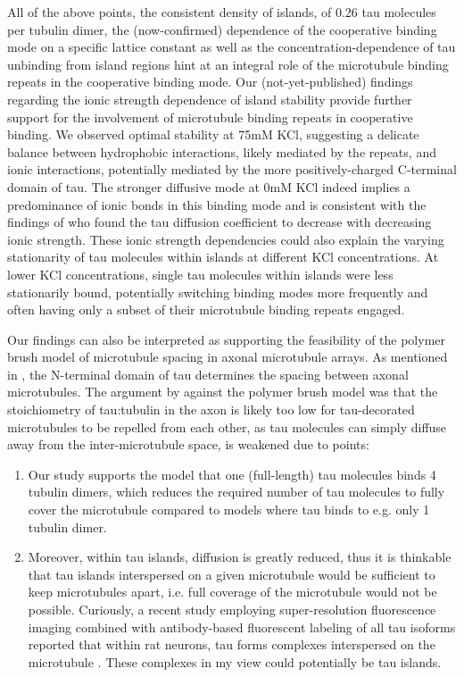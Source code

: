 All of the above points, the consistent density of islands, of 0.26 tau molecules per tubulin dimer, the (now-confirmed) dependence of the cooperative binding mode on a specific lattice constant \parencite{siahaan2022microtubule} as well as the concentration-dependence of tau unbinding from island regions hint at an integral role of the microtubule binding repeats in the cooperative binding mode. Our (not-yet-published) findings regarding the ionic strength dependence of island stability  provide further support for the involvement of microtubule binding repeats in cooperative binding. We observed optimal stability at 75mM KCl, suggesting a delicate balance between hydrophobic interactions, likely mediated by the repeats, and ionic interactions, potentially mediated by the more positively-charged C-terminal domain of tau. The stronger diffusive mode at 0mM KCl indeed implies a predominance of ionic bonds in this binding mode and is consistent with the findings of \cite{Hinrichs2012b} who found the tau diffusion coefficient to decrease with decreasing ionic strength. These ionic strength dependencies could also explain the varying stationarity of tau molecules within islands at different KCl concentrations. At lower KCl concentrations, single tau molecules within islands were less stationarily bound, potentially switching binding modes more frequently and often having only a subset of their microtubule binding repeats engaged.\par

Our findings can also be interpreted as supporting the feasibility of the polymer brush model of microtubule spacing in axonal microtubule arrays. As mentioned in , the N-terminal domain of tau determines the spacing between axonal microtubules. The argument by \cite{Gaspard} against the polymer brush model was that the stoichiometry of tau:tubulin in the axon is likely too low for tau-decorated microtubules to be repelled from each other, as tau molecules can simply diffuse away from the inter-microtubule space, is weakened due to points:
\begin{enumerate}
    \item Our study supports the model that one (full-length) tau molecules binds 4 tubulin dimers, which reduces the required number of tau molecules to fully cover the microtubule compared to models where tau binds to e.g. only 1 tubulin dimer.
    \item Moreover, within tau islands, diffusion is greatly reduced, thus it is thinkable that tau islands interspersed on a given microtubule would be sufficient to keep microtubules apart, i.e. full coverage of the microtubule would not be possible. Curiously, a recent study employing super-resolution fluorescence imaging combined with antibody-based fluorescent labeling of all tau isoforms reported that within rat neurons, tau forms complexes interspersed on the microtubule . These complexes in my view could potentially be tau islands.
\end{enumerate}

